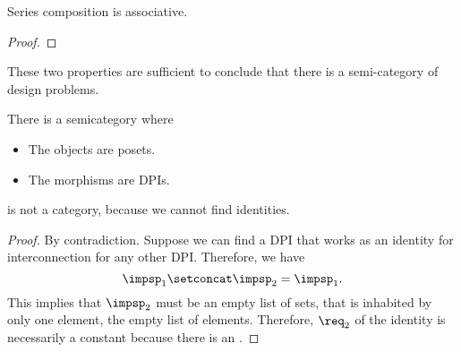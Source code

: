 \begin{lemma}
  Series composition is associative.
\end{lemma}              
\begin{proof}
\end{proof}

These two properties are sufficient to conclude that there 
is a semi-category of design problems.

\begin{lemma}
  There is a semicategory \DPI where 
  \begin{itemize}
    \item The objects are posets.
    \item The morphisms are DPIs.
  \end{itemize}
\end{lemma}

\begin{lemma}
\DPI is not a category, because we cannot find identities. 
\end{lemma}
\begin{proof}
By contradiction. Suppose we can find a DPI that works as an identity for interconnection for any other DPI.
Therefore, we have 
\begin{equation}
  \impsp_{1} \setconcat \impsp_{2} = \impsp_{1}.
\end{equation}
This implies that $\impsp_{2}$ must be an empty list of sets,  that is inhabited by only one element, the empty list of elements. Therefore, $\req_2$ of the identity is necessarily a constant because there is an . 
\end{proof}




